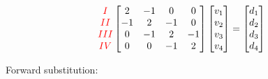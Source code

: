 \documentclass[12pt]{article}
\begin{document}
\begin{align*}
    \begin{matrix}
        \textcolor{red}{I} \\
        \textcolor{red}{II} \\
        \textcolor{red}{III} \\
        \textcolor{red}{IV}
    \end{matrix}
    \begin{bmatrix}
        2  & -1 & 0  & 0 \\
        -1 & 2  & -1 & 0 \\
        0  & -1 & 2  & -1 \\
        0  & 0  & -1 & 2
    \end{bmatrix}
    \begin{bmatrix}
        v_1 \\
        v_2 \\
        v_3 \\
        v_4
    \end{bmatrix}
    =
    \begin{bmatrix}
        d_1 \\
        d_2 \\
        d_3 \\
        d_4
    \end{bmatrix}
\end{align*}

\noindent Forward substitution:
\end{document}
